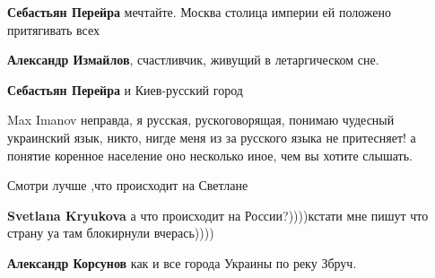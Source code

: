 \begin{itemize}
\begin{itemize}
\textbf{Себастьян Перейра} мечтайте. Москва столица империи ей положено притягивать всех \Smiley[1.0][yellow]

 
\textbf{Александр Измайлов}, счастливчик, живущий в летаргическом сне.

 
\textbf{Себастьян Перейра} и Киев-русский город

 

Max Imanov неправда, я русская, рускоговорящая, понимаю чудесный украинский
язык, никто, нигде меня из за русского языка не притесняет! а понятие коренное
население оно несколько иное, чем вы хотите слышать.

 
Смотри лучше ,что происходит на Светлане

 
\textbf{Svetlana Kryukova} а что происходит на России?))))кстати мне пишут что страну уа там блокирнули вчерась))))

 
\textbf{Александр Корсунов} как и все города Украины по реку Збруч.


\end{itemize}
\end{itemize}
